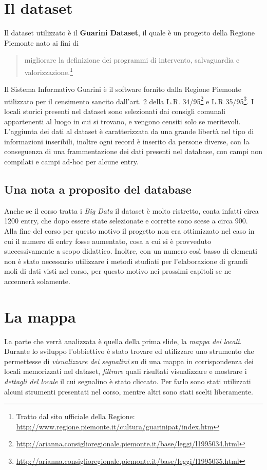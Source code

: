 	\section{Il dataset}
	Il dataset utilizzato è il \textbf{Guarini Dataset}, il quale è un progetto della Regione Piemonte nato ai fini di \begin{quote}%
	migliorare la definizione dei programmi di intervento, salvaguardia e valorizzazione.\footnote{Tratto dal sito ufficiale della Regione: \url{http://www.regione.piemonte.it/cultura/guarinipat/index.htm}}
	\end{quote}%
	Il Sistema Informativo Guarini è il software fornito dalla Regione Piemonte utilizzato per il censimento sancito dall'art. 2 della L.R. 34/95\footnote{\url{http://arianna.consiglioregionale.piemonte.it/base/leggi/l1995034.html}} e L.R 35/95\footnote{\url{http://arianna.consiglioregionale.piemonte.it/base/leggi/l1995035.html}}. I locali storici presenti nel dataset sono selezionati dai consigli comunali appartenenti al luogo in cui si trovano, e vengono censiti solo se meritevoli. L'aggiunta dei dati al dataset è caratterizzata da una grande libertà nel tipo di informazioni inseribili, inoltre ogni record è inserito da persone diverse, con la conseguenza di una frammentazione dei dati presenti nel database, con campi non compilati e campi ad-hoc per alcune entry.
	\subsection{Una nota a proposito del database}
	Anche se il corso tratta i \emph{Big Data} il dataset è molto ristretto, conta infatti circa 1200 entry, che dopo essere state selezionate e corrette sono scese a circa 900. Alla fine del corso per questo motivo il progetto non era ottimizzato nel caso in cui il numero di entry fosse aumentato, cosa a cui si è provveduto successivamente a scopo didattico. Inoltre, con un numero così basso di elementi non è stato necessario utilizzare i metodi studiati per l'elaborazione di grandi moli di dati visti nel corso, per questo motivo nei prossimi capitoli se ne accennerà solamente.
	
	
	\section{La mappa}
	La parte che verrà analizzata è quella della prima slide, la \emph{mappa dei locali}. Durante lo sviluppo l'obbiettivo è stato trovare ed utilizzare uno strumento che permettesse di \emph{visualizzare dei segnalini} su di una mappa in corrispondenza dei locali memorizzati nel dataset, \emph{filtrare} quali risultati visualizzare e mostrare i \emph{dettagli del locale} il cui segnalino è stato cliccato.
	Per farlo sono stati utilizzati alcuni strumenti presentati nel corso, mentre altri sono stati scelti liberamente.
